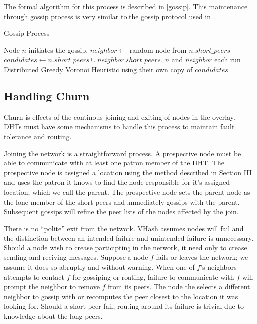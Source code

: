 \documentclass{IEEEtran}
\begin{document}
The formal algorithm for this process is described in \ref{gossip}.
This maintenance through gossip process is very similar to the gossip protocol used in \cite{raynet}.


\begin{algorithm}
\caption{Gossip Process}
\label{gossip}
\begin{algorithmic}[1]  %
	\STATE Node $n$ initiates the gossip.
	\STATE $neighbor \leftarrow$ random node from $n.short\_peers$
    \STATE $candidates \leftarrow n.short\_peers \cup neighbor.short\_peers$.
    \STATE $n$ and $neighbor$ each run Distributed Greedy Voronoi Heuristic using their own copy of $candidates$
\end{algorithmic} 
\end{algorithm}



\subsection{Handling Churn}
Churn is effects of the continous joining and exiting of nodes in the overlay.
DHTs must have some mechanisms to handle this process to maintain fault tolerance and routing.

Joining the network is a straightforward process.  
A prospective node must be able to communicate with at least one patron member of the DHT.  
The prospective node is assigned a location using the method described in Section III and uses the patron it knows to find the node responsible for it's assigned location, which we call the parent.
The prospective node sets the parent node as the lone member of the short peers and immediately gossips with the parent.
Subsequent gossips will refine the peer lists of the nodes affected by the join.

There is no ``polite'' exit from the network. VHash assumes nodes will fail and the distinction between an intended failure and unintended failure is unnecessary.
Should a node wish to crease participting in the network, it need only to crease sending and reciving messages.
Suppose a node $f$ fails or leaves the network; we assume it does so abruptly and without warning.
When one of $f$'s neighbors attempts to contact $f$ for gossiping or routing, failure to communicate with $f$ will prompt the neighbor to remove $f$ from its peers.  
The node the selects a different neighbor to gossip with or recomputes the peer closest to the location it was looking for. 
Should a short peer fail, routing around its failure is trivial due to knowledge about the long peers.
\end{document}
